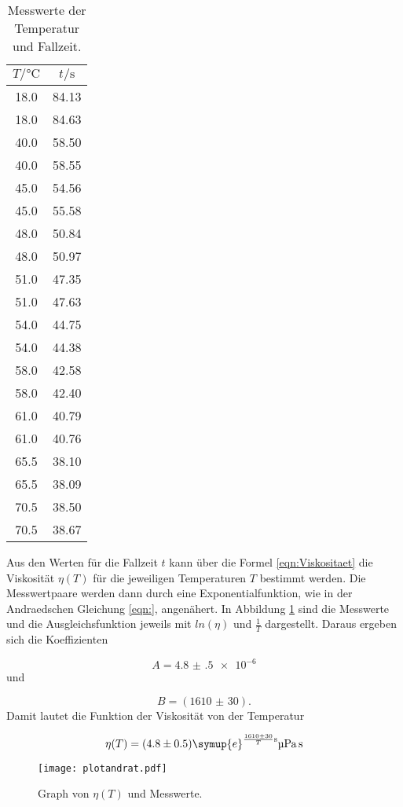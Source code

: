 \begin{table}[h]
  \centering
  \caption{Messwerte der Temperatur und Fallzeit.}
  \label{tab:FallTemp}
  \begin{tabular}{c c}
    \toprule
    $T/\si{\celsius}$ & $t/\si{\second}$ \\
    \midrule
    18.0 & 84.13 \\
    18.0 & 84.63 \\
    40.0 & 58.50 \\
    40.0 & 58.55 \\
    45.0 & 54.56 \\
    45.0 & 55.58 \\
    48.0 & 50.84 \\
    48.0 & 50.97 \\
    51.0 & 47.35 \\
    51.0 & 47.63 \\
    54.0 & 44.75 \\
    54.0 & 44.38 \\
    58.0 & 42.58 \\
    58.0 & 42.40 \\
    61.0 & 40.79 \\
    61.0 & 40.76 \\
    65.5 & 38.10 \\
    65.5 & 38.09 \\
    70.5 & 38.50 \\
    70.5 & 38.67 \\
    \bottomrule
  \end{tabular}
\end{table}

Aus den Werten für die Fallzeit $t$ kann über die Formel \eqref{eqn:Viskositaet}
die Viskosität $\eta(T)$ für die jeweiligen Temperaturen $T$ bestimmt werden.
Die Messwertpaare werden dann durch eine Exponentialfunktion, wie in der
Andraedschen Gleichung \eqref{eqn:}, angenähert.
In Abbildung \ref{fig:VisTemp} sind die Messwerte und die Ausgleichsfunktion
jeweils mit $ln(\eta)$ und $\frac{1}{T}$ dargestellt.
Daraus ergeben sich die Koeffizienten

\begin{equation}
  A = \num{4.8(5)e-6}
\end{equation}
und

\begin{equation}
  B = (\num{1610(30)}).
\end{equation}
Damit lautet die Funktion der Viskosität von der Temperatur

\begin{equation}
  \eta(T) = (\num{4.8(5)}) \symup{e}^{\frac{\num{1610(30)}}{T}\si{\second}}
  \si{\micro\pascal\second}
\end{equation}

\begin{figure}
  \centering
  \texttt{[image: plotandrat.pdf]}
  \caption{Graph von $\eta(T)$ und Messwerte.}
  \label{fig:VisTemp}
\end{figure}
